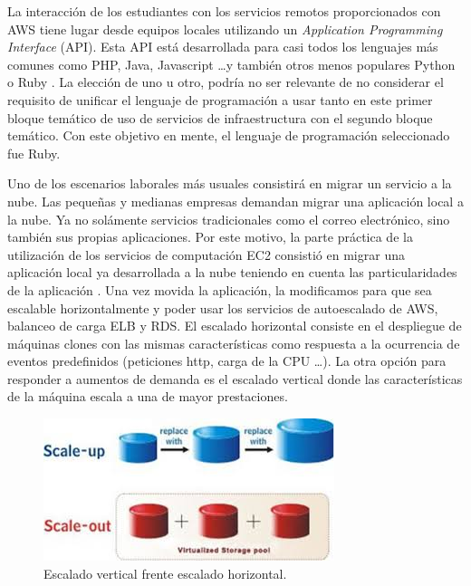 \documentclass[conference]{IEEEtran}
\begin{document}
La interacción de los estudiantes con los servicios remotos proporcionados con
AWS tiene lugar desde equipos locales utilizando un \textit{Application
Programming Interface} (API). Esta API está desarrollada para casi todos los
lenguajes más comunes como PHP, Java,
Javascript \dots y también otros menos populares Python o Ruby \cite{Ruby:2013}.
La elección de uno u otro, podría no ser relevante de no considerar el requisito
de unificar el lenguaje de programación
a usar tanto en este primer bloque temático de uso de servicios de
infraestructura con el segundo bloque temático. Con este objetivo en mente, el
lenguaje de programación seleccionado fue Ruby.

Uno de los escenarios laborales más usuales consistirá en migrar un servicio a la nube.
Las pequeñas y medianas empresas demandan migrar una aplicación local a la nube.
Ya no solámente servicios tradicionales como el correo electrónico, sino también sus propias aplicaciones.
Por este motivo, la parte práctica de la utilización de los servicios de computación EC2
consistió en migrar una aplicación local ya desarrollada a la nube teniendo en
cuenta las particularidades de la aplicación \cite{Reese:2013, Barr:2010}. Una
vez movida la aplicación, la modificamos  para que sea escalable
horizontalmente y poder usar los servicios de autoescalado de AWS, balanceo de
carga ELB y RDS.
El escalado horizontal consiste en el despliegue de máquinas clones con las mismas características  como respuesta a la ocurrencia de eventos predefinidos
(peticiones http, carga de la CPU \dots). La otra opción para responder a aumentos de demanda es el escalado vertical donde las características de la máquina escala a una de mayor prestaciones.

\begin{figure}[!t]
\centering
\includegraphics[width=\columnwidth]{scale.jpeg}
\caption{Escalado vertical frente escalado horizontal.}
\label{fig:console}
\end{figure}
\end{document}
